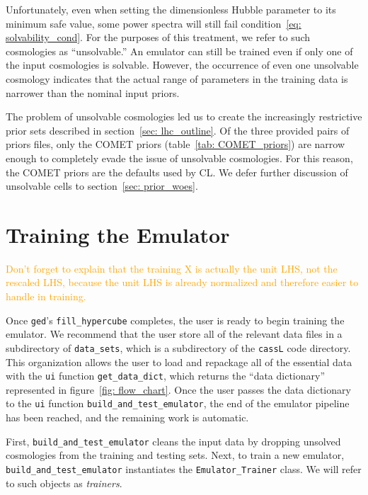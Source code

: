 Unfortunately, even when setting the dimensionless Hubble parameter to its
minimum safe value, some power spectra will still fail
condition~\ref{eq: solvability_cond}.
For the purposes of this treatment, we refer to such cosmologies as
``unsolvable.'' An emulator can still be trained even if only one of the input 
cosmologies is solvable. However, the occurrence of even one
unsolvable cosmology indicates that the actual range of parameters in the
training data is narrower than the nominal input priors. 

The problem of unsolvable cosmologies led us to create the
increasingly restrictive prior sets described in
section~\ref{sec: lhc_outline}.
Of the three provided pairs of priors files, only the COMET priors
(table~\ref{tab: COMET_priors}) are narrow enough to completely evade the 
issue of unsolvable cosmologies. For this reason, the COMET priors are the
defaults used by CL. We defer further discussion of unsolvable cells to
section~\ref{sec: prior_woes}.



\section{Training the Emulator}
\label{sec: train_emu}

\textcolor{orange}{Don't forget to explain that the training X is actually the
unit LHS, not the rescaled LHS, because the unit LHS is already normalized
and therefore easier to handle in training.}


Once \texttt{ged}'s \verb|fill_hypercube| completes, the user is ready to
begin training the emulator. We recommend that the user store all of the
relevant data files in a subdirectory of \verb|data_sets|, which is a
subdirectory of the \texttt{cassL} code directory. This organization
allows the user to load and repackage all of the essential data with the
\texttt{ui} function \verb|get_data_dict|, which returns the
``data dictionary'' represented in figure~\ref{fig: flow_chart}.
Once the user passes the data dictionary to the \texttt{ui} function
\verb|build_and_test_emulator|, the end of the emulator pipeline has been 
reached, and the remaining work is automatic.

First, \verb|build_and_test_emulator| cleans the input data by dropping
unsolved cosmologies from the training and testing sets. Next, to train a new 
emulator, \verb|build_and_test_emulator| instantiates the
\verb|Emulator_Trainer| class. We will refer to such objects 
as \textit{trainers}.

